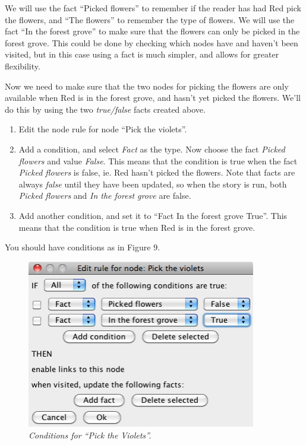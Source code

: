 \documentclass{article}
\begin{document}
We will use the fact ``Picked flowers'' to remember if the reader has had Red
pick the flowers, and ``The flowers'' to remember the type of flowers. We will
use the fact ``In the forest grove'' to make sure that the flowers can only be
picked in the forest grove. This could be done by checking which nodes have and
haven't been visited, but in this case using a fact is much simpler, and allows
for greater flexibility.

Now we need to make sure that the two nodes for picking the flowers are only
available when Red is in the forest grove, and hasn't yet picked the flowers.
We'll do this by using the two \textit{true/false} facts created above.

\begin{enumerate}
  \item Edit the node rule for node ``Pick the violets''.
  \item Add a condition, and select \textit{Fact} as the type. Now choose the
  fact \textit{Picked flowers} and value \textit{False}. This means that the
  condition is true when the fact \textit{Picked flowers} is false, ie. Red
  hasn't picked the flowers. Note that facts are always \textit{false} until
  they have been updated, so when the story is run, both \textit{Picked
  flowers} and \textit{In the forest grove} are false.
  \item Add another condition, and set it to ``Fact In the forest grove True''.
  This means that the condition is true when Red is in the forest grove.
\end{enumerate}

You should have conditions as in Figure 9.

\begin{figure}[h]
  \centering
  \includegraphics[width=10cm]{images/hypedyn-tutorial-3-figure-9}
  \caption{\textit{Conditions for ``Pick the Violets''.}}
\end{figure}
\end{document}
